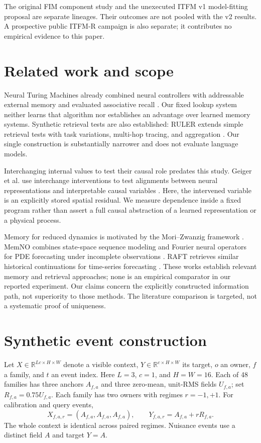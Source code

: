 \documentclass[11pt]{article}
\newcommand{\R}{\mathbb{R}}
\begin{document}
The original FIM component study and the unexecuted ITFM v1 model-fitting
proposal are separate lineages. Their outcomes are not pooled with the v2
results. A prospective public ITFM-R campaign is also separate; it contributes
no empirical evidence to this paper.

\section{Related work and scope}
Neural Turing Machines already combined neural controllers with addressable
external memory and evaluated associative recall \cite{graves2014ntm}.
Our fixed lookup system neither learns that algorithm nor establishes an
advantage over learned memory systems. Synthetic retrieval tests are also
established: RULER extends simple retrieval tests with task variations,
multi-hop tracing, and aggregation \cite{hsieh2024ruler}. Our single
construction is substantially narrower and does not evaluate language models.

Interchanging internal values to test their causal role predates this study.
Geiger et al. use interchange interventions to test alignments between neural
representations and interpretable causal variables \cite{geiger2021causal}.
Here, the intervened variable is an explicitly stored spatial residual. We
measure dependence inside a fixed program rather than assert a full causal
abstraction of a learned representation or a physical process.

Memory for reduced dynamics is motivated by the Mori--Zwanzig framework
\cite{lin2021mori}. MemNO combines state-space sequence modeling and Fourier
neural operators for PDE forecasting under incomplete observations
\cite{ruiz2024memory}. RAFT retrieves similar historical continuations for
time-series forecasting \cite{han2025raft}. These works establish relevant
memory and retrieval approaches; none is an empirical comparator in our
reported experiment. Our claims concern the explicitly constructed information
path, not superiority to those methods. The literature comparison is targeted,
not a systematic proof of uniqueness.

\section{Synthetic event construction}
Let $X\in\R^{Lc\times H\times W}$ denote a visible context, $Y\in\R^{c\times
H\times W}$ its target, $o$ an owner, $f$ a family, and $t$ an event index.
Here $L=3$, $c=1$, and $H=W=16$. Each of 48 families has three anchors
$A_{f,a}$ and three zero-mean, unit-RMS fields $U_{f,a}$; set
$R_{f,a}=0.75U_{f,a}$. Each family has two owners with regimes $r=-1,+1$.
For calibration and query events,
\begin{equation}
 X_{f,a,r}=(A_{f,a},A_{f,a},A_{f,a}),\qquad
 Y_{f,a,r}=A_{f,a}+rR_{f,a}.
\end{equation}
The whole context is identical across paired regimes. Nuisance events use a
distinct field $A$ and target $Y=A$.
\end{document}
